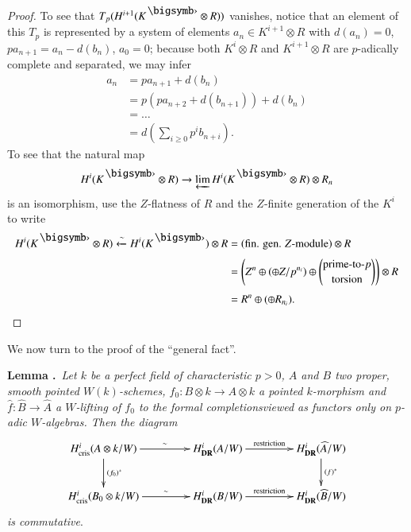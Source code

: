 \begin{proof}
To see that $T_{p}(H^{i+1}(K^{\bigdot}\otimes R))$ vanishes, notice that an element of this $T_{p}$ is represented by a system of elements $a_{n}\in K^{i+1}\otimes R$ with $d(a_{n})=0$, $pa_{n+1}=a_{n}-d(b_{n})$, $a_{0}=0$; because both $K^{i}\otimes R$ and $K^{i+1}\otimes R$ are $p$-adically complete and separated, we may infer
\begin{align*}
a_{n} &= pa_{n+1}+d(b_{n})\\[3pt]
&= p\left(pa_{n+2}+d(b_{n+1})\right)+d(b_{n})\\[3pt]
&= \ldots\\[3pt]
&= d\left(\sum\limits_{i\geq 0}p^{i}b_{n+i}\right).
\end{align*}
To see that the natural map
$$
H^{i}(K^{\bigdot}\otimes R)\to \varprojlim H^{i}(K^{\bigdot}\otimes R)\otimes R_{n}
$$
is an isomorphism, use the $Z$-flatness of $R$ and the $Z$-finite generation of the $K^{i}$ to write
\begin{align*}
H^{i}(K^{\bigdot}\otimes R)\xleftarrow{\sim} H^{i}(K^{\bigdot})\otimes R &= (\text{fin. gen. $Z$-module})\otimes R\\[3pt]
&= \left(Z^{n}\oplus (\oplus Z/p^{n_{i}})\oplus \binom{\text{prime-to-$p$}}{\text{torsion}}\right)\otimes R\\[3pt]
&= R^{n}\oplus (\oplus R_{n_{i}}).
\end{align*}
\end{proof}

We now turn to the proof of the ``general fact''.

\medskip
\noindent
{\bf Lemma .\label{art6-lem5.8.2}}~{\em Let $k$ be a perfect field of characteristic $p>0$, $A$ and $B$ two proper, smooth pointed $W(k)$-schemes, $f_{0}:B\otimes k\to A\otimes k$ a pointed $k$-morphism and $\widehat{f}:\widehat{B}\to \widehat{A}$ a $W$-lifting of $f_{0}$ to the formal completions\pageoriginale viewed as functors only on $p$-adic $W$-algebras. Then the diagram}
\[
\xymatrix@C=1.5cm{
H^{i}_{\text{cris}}(A\otimes k/W)\ar[d]^-{(f_{0})^{*}}\ar[r]^-{\sim} & H^{i}_{\DR}(A/W)\ar[r]^{\text{restriction}} & H^{i}_{\DR}(\widehat{A}/W)\ar[d]^-{(f)^{*}}\\
H^{i}_{\text{cris}}(B_{0}\otimes k/W)\ar[r]^-{\sim} & H^{i}_{\DR}(B/W)\ar[r]^-{\text{restriction}} & H^{i}_{\DR}(\widehat{B}/W)
}
\]
{\em is commutative}.
\smallskip

